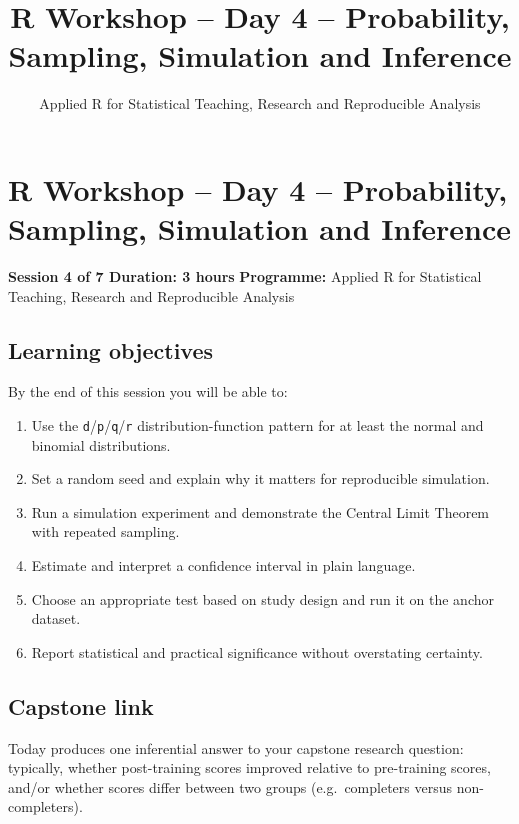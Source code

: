 \documentclass[11pt]{article}
\title{R Workshop -- Day 4 -- Probability, Sampling, Simulation and Inference}
\author{Applied R for Statistical Teaching, Research and Reproducible Analysis}
\date{}
\providecommand{\tightlist}{%
  \setlength{\itemsep}{0pt}\setlength{\parskip}{0pt}}
\begin{document}
\maketitle
\tableofcontents
\newpage
\hypertarget{r-workshop-day-4-probability-sampling-simulation-and-inference}{%
\section{R Workshop -- Day 4 -- Probability, Sampling, Simulation and
Inference}\label{r-workshop-day-4-probability-sampling-simulation-and-inference}}

\textbf{Session 4 of 7 \textbar{} Duration: 3 hours} \textbf{Programme:}
Applied R for Statistical Teaching, Research and Reproducible Analysis

\hypertarget{learning-objectives}{%
\subsection{Learning objectives}\label{learning-objectives}}

By the end of this session you will be able to:

\begin{enumerate}
\def\labelenumi{\arabic{enumi}.}
\tightlist
\item
  Use the \texttt{d}/\texttt{p}/\texttt{q}/\texttt{r}
  distribution-function pattern for at least the normal and binomial
  distributions.
\item
  Set a random seed and explain why it matters for reproducible
  simulation.
\item
  Run a simulation experiment and demonstrate the Central Limit Theorem
  with repeated sampling.
\item
  Estimate and interpret a confidence interval in plain language.
\item
  Choose an appropriate test based on study design and run it on the
  anchor dataset.
\item
  Report statistical and practical significance without overstating
  certainty.
\end{enumerate}

\hypertarget{capstone-link}{%
\subsection{Capstone link}\label{capstone-link}}

Today produces one inferential answer to your capstone research
question: typically, whether post-training scores improved relative to
pre-training scores, and/or whether scores differ between two groups
(e.g.~completers versus non-completers).
\end{document}
